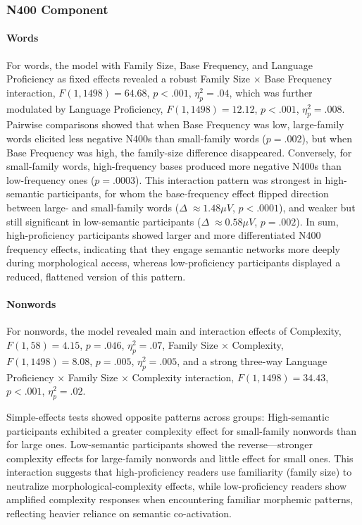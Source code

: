 \documentclass[preprint,12pt, authoryear, review]{elsarticle}
\begin{document}
\subsubsection{N400 Component}

\paragraph{Words}

For words, the model with Family Size, Base Frequency, and Language Proficiency as fixed effects revealed a robust Family Size × Base Frequency interaction, $F(1, 1498) = 64.68$, $p < .001$, $\eta_p^2 = .04$, which was further modulated by Language Proficiency, $F(1, 1498) = 12.12$, $p < .001$, $\eta_p^2 = .008$.
Pairwise comparisons showed that when Base Frequency was low, large-family words elicited less negative N400s than small-family words ($p = .002$), but when Base Frequency was high, the family-size difference disappeared. Conversely, for small-family words, high-frequency bases produced more negative N400s than low-frequency ones ($p = .0003$). This interaction pattern was strongest in high-semantic participants, for whom the base-frequency effect flipped direction between large- and small-family words ($\Delta \; \approx 1.48 \mu V$, $p < .0001$), and weaker but still significant in low-semantic participants ($\Delta \; \approx 0.58 \mu V$, $p = .002$). In sum, high-proficiency participants showed larger and more differentiated N400 frequency effects, indicating that they engage semantic networks more deeply during morphological access, whereas low-proficiency participants displayed a reduced, flattened version of this pattern.

\paragraph{Nonwords}

For nonwords, the model revealed main and interaction effects of Complexity, $F(1, 58) = 4.15$, $p = .046$, $\eta_p^2 = .07$, Family Size × Complexity, $F(1, 1498) = 8.08$, $p = .005$, $\eta_p^2 = .005$, and a strong three-way Language Proficiency × Family Size × Complexity interaction, $F(1, 1498) = 34.43$, $p < .001$, $\eta_p^2 = .02$.

Simple-effects tests showed opposite patterns across groups:
High-semantic participants exhibited a greater complexity effect for small-family nonwords than for large ones.
Low-semantic participants showed the reverse—stronger complexity effects for large-family nonwords and little effect for small ones.
This interaction suggests that high-proficiency readers use familiarity (family size) to neutralize morphological-complexity effects, while low-proficiency readers show amplified complexity responses when encountering familiar morphemic patterns, reflecting heavier reliance on semantic co-activation.
\end{document}
